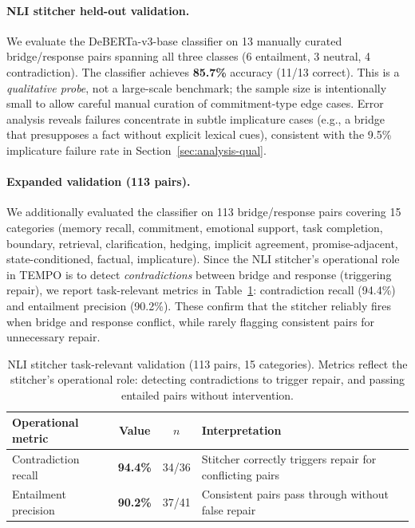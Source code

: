 \documentclass[11pt]{article}
\begin{document}
\paragraph{NLI stitcher held-out validation.}
We evaluate the DeBERTa-v3-base classifier on 13 manually curated bridge/response pairs spanning all three classes (6 entailment, 3 neutral, 4 contradiction). The classifier achieves \textbf{85.7\%} accuracy (11/13 correct). This is a \emph{qualitative probe}, not a large-scale benchmark; the sample size is intentionally small to allow careful manual curation of commitment-type edge cases. Error analysis reveals failures concentrate in subtle implicature cases (e.g., a bridge that presupposes a fact without explicit lexical cues), consistent with the 9.5\% implicature failure rate in Section~\ref{sec:analysis-qual}.

\paragraph{Expanded validation (113 pairs).}
We additionally evaluated the classifier on 113 bridge/response pairs covering 15 categories (memory recall, commitment, emotional support, task completion, boundary, retrieval, clarification, hedging, implicit agreement, promise-adjacent, state-conditioned, factual, implicature). Since the NLI stitcher's operational role in TEMPO is to detect \emph{contradictions} between bridge and response (triggering repair), we report task-relevant metrics in Table~\ref{tab:nli-validation-expanded}: contradiction recall (94.4\%) and entailment precision (90.2\%). These confirm that the stitcher reliably fires when bridge and response conflict, while rarely flagging consistent pairs for unnecessary repair.

\begin{table}[t]
  \caption{NLI stitcher task-relevant validation (113 pairs, 15 categories). Metrics reflect the stitcher's operational role: detecting contradictions to trigger repair, and passing entailed pairs without intervention.}
  \label{tab:nli-validation-expanded}
  \centering
  \setlength{\tabcolsep}{4pt}
  \begin{tabular}{lccl}
    \toprule
    Operational metric & Value & $n$ & Interpretation \\
    \midrule
    Contradiction recall & \textbf{94.4\%} & 34/36 & Stitcher correctly triggers repair for conflicting pairs \\
    Entailment precision & \textbf{90.2\%} & 37/41 & Consistent pairs pass through without false repair \\
    \bottomrule
  \end{tabular}
\end{table}
\end{document}
